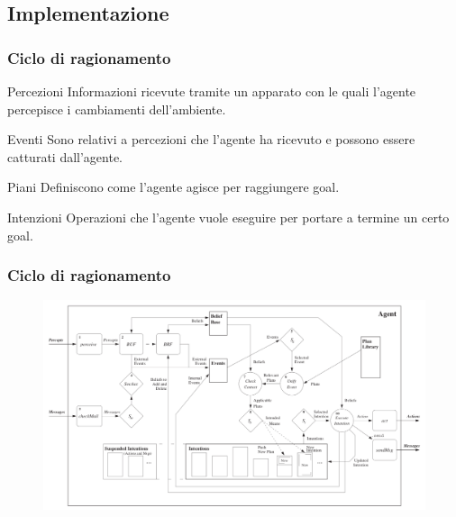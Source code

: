 \documentclass[handout]{beamer}\mode<presentation>{\usetheme{AMSCesenaBleu}}
\begin{document}
\subsection{Implementazione}
\begin{frame}
\frametitle{Ciclo di ragionamento}
\begin{block}{Percezioni}
Informazioni ricevute tramite un apparato con le quali l'agente percepisce i cambiamenti dell'ambiente.
\end{block}

\begin{block}{Eventi}
Sono relativi a percezioni che l'agente ha ricevuto e possono essere catturati dall'agente.
\end{block}

\begin{block}{Piani}
Definiscono come l'agente agisce per raggiungere goal.
\end{block}

\begin{block}{Intenzioni}
Operazioni che l'agente vuole eseguire per portare a termine un certo goal.
\end{block}
\end{frame}


\begin{frame}
\frametitle{Ciclo di ragionamento}
\begin{figure}
\hspace*{-0.35cm}
\includegraphics[width=12.5cm]{images/reasoningCicle.png}
\end{figure}
\end{frame}
\end{document}
